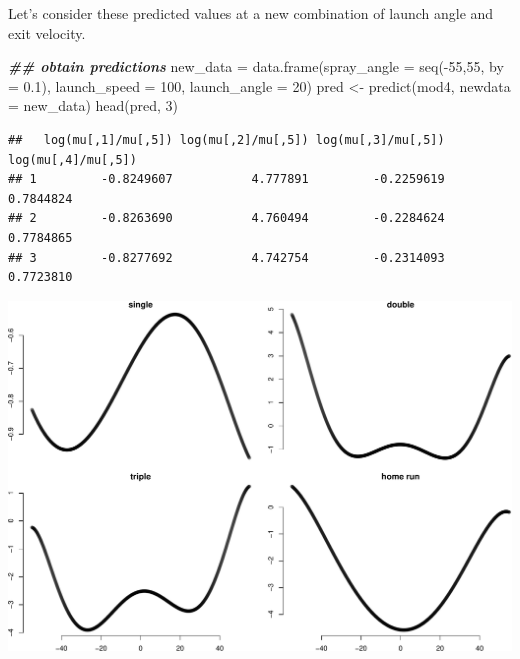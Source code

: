 \documentclass[
  ignorenonframetext,
]{beamer}
\newenvironment{Shaded}{\begin{snugshade}}{\end{snugshade}}
\newcommand{\AttributeTok}[1]{\textcolor[rgb]{0.77,0.63,0.00}{#1}}
\newcommand{\DecValTok}[1]{\textcolor[rgb]{0.00,0.00,0.81}{#1}}
\newcommand{\DocumentationTok}[1]{\textcolor[rgb]{0.56,0.35,0.01}{\textbf{\textit{#1}}}}
\newcommand{\FloatTok}[1]{\textcolor[rgb]{0.00,0.00,0.81}{#1}}
\newcommand{\FunctionTok}[1]{\textcolor[rgb]{0.00,0.00,0.00}{#1}}
\newcommand{\NormalTok}[1]{#1}
\newcommand{\OtherTok}[1]{\textcolor[rgb]{0.56,0.35,0.01}{#1}}
\newcommand{\SpecialCharTok}[1]{\textcolor[rgb]{0.00,0.00,0.00}{#1}}
\begin{document}
\begin{frame}[fragile]{}
\protect\hypertarget{section-17}{}
Let's consider these predicted values at a new combination of launch
angle and exit velocity.

\vspace{12pt}
\tiny

\begin{Shaded}
\begin{Highlighting}[]
\DocumentationTok{\#\# obtain predictions}
\NormalTok{new\_data }\OtherTok{=} \FunctionTok{data.frame}\NormalTok{(}\AttributeTok{spray\_angle =} \FunctionTok{seq}\NormalTok{(}\SpecialCharTok{{-}}\DecValTok{55}\NormalTok{,}\DecValTok{55}\NormalTok{, }\AttributeTok{by =} \FloatTok{0.1}\NormalTok{), }
           \AttributeTok{launch\_speed =} \DecValTok{100}\NormalTok{, }
           \AttributeTok{launch\_angle =} \DecValTok{20}\NormalTok{)}
\NormalTok{pred }\OtherTok{\textless{}{-}} \FunctionTok{predict}\NormalTok{(mod4, }\AttributeTok{newdata =}\NormalTok{ new\_data)}
\FunctionTok{head}\NormalTok{(pred, }\DecValTok{3}\NormalTok{)}
\end{Highlighting}
\end{Shaded}

\begin{verbatim}
##   log(mu[,1]/mu[,5]) log(mu[,2]/mu[,5]) log(mu[,3]/mu[,5]) log(mu[,4]/mu[,5])
## 1         -0.8249607           4.777891         -0.2259619          0.7844824
## 2         -0.8263690           4.760494         -0.2284624          0.7784865
## 3         -0.8277692           4.742754         -0.2314093          0.7723810
\end{verbatim}
\end{frame}

\begin{frame}{}
\protect\hypertarget{section-18}{}
\includegraphics{week6_p1_files/figure-beamer/unnamed-chunk-6-1.pdf}
\end{frame}
\end{document}
